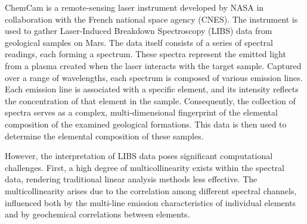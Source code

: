 ChemCam is a remote-sensing laser instrument developed by NASA in collaboration with the French national space agency (CNES).
The instrument is used to gather Laser-Induced Breakdown Spectroscopy (LIBS) data from geological samples on Mars. The data itself consists of a series of spectral readings, each forming a spectrum. These spectra represent the emitted light from a plasma created when the laser interacts with the target sample. Captured over a range of wavelengths, each spectrum is composed of various emission lines. Each emission line is associated with a specific element, and its intensity reflects the concentration of that element in the sample. Consequently, the collection of spectra serves as a complex, multi-dimensional fingerprint of the elemental composition of the examined geological formations.
This data is then used to determine the elemental composition of these samples.\cite{cleggRecalibrationMarsScience2017}

% 

However, the interpretation of LIBS data poses significant computational challenges.
First, a high degree of multicollinearity exists within the spectral data, rendering traditional linear analysis methods less effective.
The multicollinearity arises due to the correlation among different spectral channels, influenced both by the multi-line emission characteristics of individual elements and by geochemical correlations between elements.\cite{andersonImprovedAccuracyQuantitative2017}

